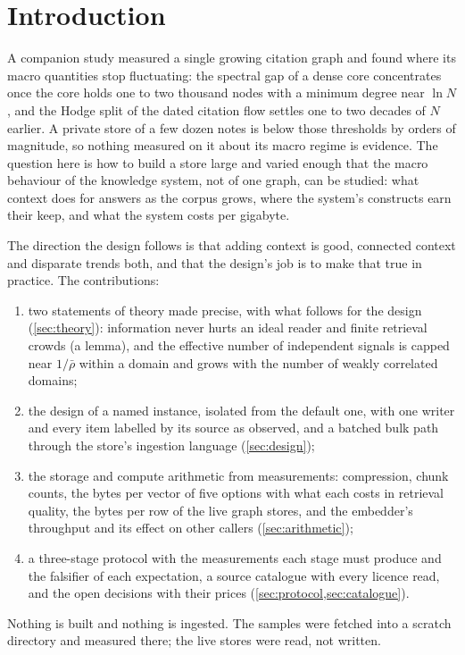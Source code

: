 \documentclass[11pt]{article}
\theoremstyle{plain}
\theoremstyle{definition}
\theoremstyle{remark}
\begin{document}
\section{Introduction}
A companion study measured a single growing citation graph and found where its macro quantities
stop fluctuating: the spectral gap of a dense core concentrates once the core holds one to two
thousand nodes with a minimum degree near $\ln N$, and the Hodge split of the dated citation flow
settles one to two decades of $N$ earlier. A private store of a few dozen notes is below those
thresholds by orders of magnitude, so nothing measured on it about its macro regime is evidence.
The question here is how to build a store large and varied enough that the macro behaviour of the
knowledge system, not of one graph, can be studied: what context does for answers as the corpus
grows, where the system's constructs earn their keep, and what the system costs per gigabyte.

The direction the design follows is that adding context is good, connected context and disparate
trends both, and that the design's job is to make that true in practice. The contributions:
\begin{enumerate}
  \item two statements of theory made precise, with what follows for the design (\cref{sec:theory}):
    information never hurts an ideal reader and finite retrieval crowds (a lemma), and the
    effective number of independent signals is capped near $1/\bar\rho$ within a domain and grows
    with the number of weakly correlated domains;
  \item the design of a named instance, isolated from the default one, with one writer and every
    item labelled by its source as observed, and a batched bulk path through the store's ingestion
    language (\cref{sec:design});
  \item the storage and compute arithmetic from measurements: compression, chunk counts, the bytes
    per vector of five options with what each costs in retrieval quality, the bytes per row of the
    live graph stores, and the embedder's throughput and its effect on other callers
    (\cref{sec:arithmetic});
  \item a three-stage protocol with the measurements each stage must produce and the falsifier of
    each expectation, a source catalogue with every licence read, and the open decisions with
    their prices (\cref{sec:protocol,sec:catalogue}).
\end{enumerate}
Nothing is built and nothing is ingested. The samples were fetched into a scratch directory and
measured there; the live stores were read, not written.
\end{document}
